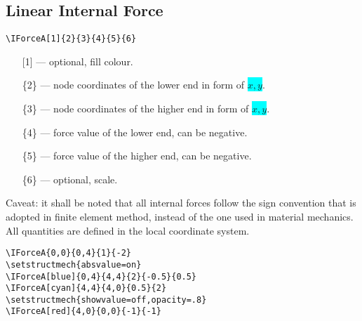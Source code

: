 \documentclass[10pt,a4paper]{article}
\newcommand*{\Highlight}[1]{\colorbox{cyan}{\color{red}\texttt{#1}}}
\begin{document}
\subsection{Linear Internal Force}
\begin{Verbatim}[frame=single,label=Syntax]
\IForceA[1]{2}{3}{4}{5}{6}
\end{Verbatim}
\begin{enumerate}
\item[][1] --- optional, fill colour.
\item[]\{2\} --- node coordinates of the lower end in form of \Highlight{$x,y$}.
\item[]\{3\} --- node coordinates of the higher end in form of \Highlight{$x,y$}.
\item[]\{4\} --- force value of the lower end, can be negative.
\item[]\{5\} --- force value of the higher end, can be negative.
\item[]\{6\} --- optional, scale.
\end{enumerate}
Caveat: it shall be noted that all internal forces follow the sign convention that is adopted in finite element method, instead of the one used in material mechanics. All quantities are defined in the local coordinate system.
\begin{Verbatim}[frame=single,label=Example]
\IForceA{0,0}{0,4}{1}{-2}
\setstructmech{absvalue=on}
\IForceA[blue]{0,4}{4,4}{2}{-0.5}{0.5}
\IForceA[cyan]{4,4}{4,0}{0.5}{2}
\setstructmech{showvalue=off,opacity=.8}
\IForceA[red]{4,0}{0,0}{-1}{-1}
\end{Verbatim}
\begin{figure}[H]
\centering
{}
\end{figure}
\end{document}
